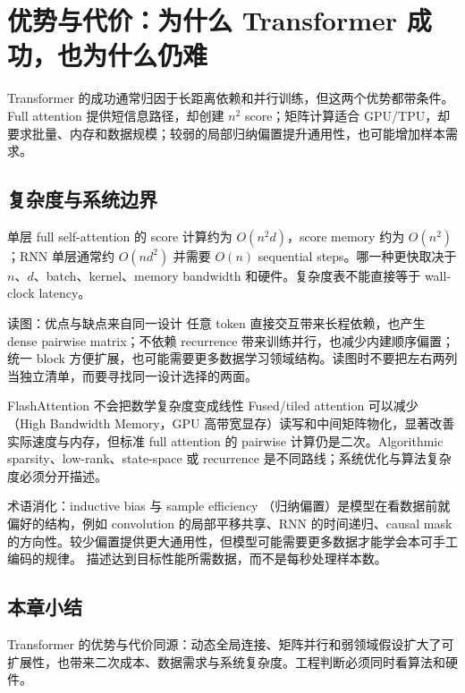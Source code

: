 \section{优势与代价：为什么 Transformer 成功，也为什么仍难}

Transformer 的成功通常归因于长距离依赖和并行训练，但这两个优势都带条件。Full attention 提供短信息路径，却创建 $n^2$ score；矩阵计算适合 GPU/TPU，却要求批量、内存和数据规模；较弱的局部归纳偏置提升通用性，也可能增加样本需求。

\subsection{复杂度与系统边界}

单层 full self-attention 的 score 计算约为 $O(n^2d)$，score memory 约为 $O(n^2)$；RNN 单层通常约 $O(nd^2)$ 并需要 $O(n)$ sequential steps。哪一种更快取决于 $n$、$d$、batch、kernel、memory bandwidth 和硬件。复杂度表不能直接等于 wall-clock latency。


\begin{knowledgebox}{读图：优点与缺点来自同一设计}
任意 token 直接交互带来长程依赖，也产生 dense pairwise matrix；不依赖 recurrence 带来训练并行，也减少内建顺序偏置；统一 block 方便扩展，也可能需要更多数据学习领域结构。读图时不要把左右两列当独立清单，而要寻找同一设计选择的两面。
\end{knowledgebox}

\begin{warningbox}{FlashAttention 不会把数学复杂度变成线性}
Fused/tiled attention 可以减少 （High Bandwidth Memory，GPU 高带宽显存）读写和中间矩阵物化，显著改善实际速度与内存，但标准 full attention 的 pairwise 计算仍是二次。Algorithmic sparsity、low-rank、state-space 或 recurrence 是不同路线；系统优化与算法复杂度必须分开描述。
\end{warningbox}

\begin{knowledgebox}{术语消化：inductive bias 与 sample efficiency}
（归纳偏置）是模型在看数据前就偏好的结构，例如 convolution 的局部平移共享、RNN 的时间递归、causal mask 的方向性。较少偏置提供更大通用性，但模型可能需要更多数据才能学会本可手工编码的规律。 描述达到目标性能所需数据，而不是每秒处理样本数。
\end{knowledgebox}

\subsection{本章小结}

Transformer 的优势与代价同源：动态全局连接、矩阵并行和弱领域假设扩大了可扩展性，也带来二次成本、数据需求与系统复杂度。工程判断必须同时看算法和硬件。

